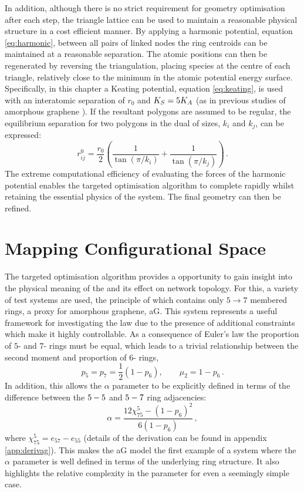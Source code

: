 In addition, although there is no strict requirement for geometry optimisation after each step, the triangle lattice can be used to maintain a reasonable physical structure in a cost efficient manner.
By applying a harmonic potential, equation \eqref{eq:harmonic}, between all pairs of linked nodes the ring centroids can be maintained at a reasonable separation.
The atomic positions can then be regenerated by reversing the triangulation, placing species at the centre of each triangle, relatively close to the minimum in the atomic potential energy surface.
Specifically, in this chapter a Keating potential, equation \eqref{eq:keating}, is used  with an interatomic separation of $r_0$ and $K_S=5K_A$ (as in previous studies of amorphous graphene \cite{Kumar2012}).
If the resultant polygons are assumed to be regular, the equilibrium separation for two polygons in the dual of sizes, $k_i$ and $k_j$, can be expressed:
\begin{equation}
	r_{ij}^0 = \frac{r_0}{2}\left(\frac{1}{\tan\left(\pi/k_i\right)}+\frac{1}{\tan\left(\pi/k_j\right)}\right)\,.
\end{equation}
The extreme computational efficiency of evaluating the forces of the harmonic potential enables the targeted optimisation algorithm to complete rapidly whilst retaining the essential physics of the system.
The final geometry can then be refined.

\section{Mapping Configurational Space}
\label{s:toptmapconfigspace}

The targeted optimisation algorithm provides a opportunity to gain insight into the physical meaning of the \aw{} and its effect on network topology.
For this, a variety of test systems are used, the principle of which contains only $5\rightarrow 7$ membered rings, a proxy for amorphous graphene, aG.
This system represents a useful framework for investigating the \aw{} law due to the presence of additional constraints which make it highly controllable. As a consequence of Euler's law the proportion of $5$\-- and $7$\-- rings must be equal, which leads to a trivial relationship between the second moment and proportion of $6$- rings,
\begin{equation}
\label{eq:agcon}
        p_5=p_7=\frac{1}{2}\left(1-p_6\right), \qquad \mu_2=1-p_6 \,.
\end{equation}
In addition, this allows the $\alpha$ parameter to be explicitly defined in terms of the difference between the $5\--5$ and $5\--7$ ring adjacencies:
\begin{equation}
	\label{eq:agalpha}
	\alpha = \frac{12\chi_{75}^5-\left(1-p_6\right)^2}{6\left(1-p_6\right)}\,,
\end{equation}
where $\chi_{75}^5=e_{57}-e_{55}$ (details of the derivation can be found in appendix \ref{app:derivag}).
This makes the aG model the first example of a system where the $\alpha$ parameter is well defined in terms of the underlying ring structure.
It also highlights the relative complexity in the \aw{} parameter for even a seemingly simple case.

